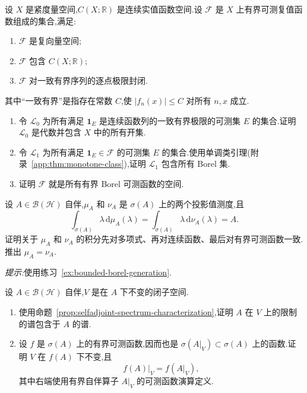 \begin{exercise}\label{ex:bounded-borel-generation}
设 \(X\) 是紧度量空间,\(C(X;\mathbb{R})\) 是连续实值函数空间.设 \(\mathcal{F}\) 是 \(X\) 上有界可测复值函数组成的集合,满足:
\begin{enumerate}
\item \(\mathcal{F}\) 是复向量空间;
\item \(\mathcal{F}\) 包含 \(C(X;\mathbb{R})\);
\item \(\mathcal{F}\) 对一致有界序列的逐点极限封闭.
\end{enumerate}
其中“一致有界”是指存在常数 \(C\),使 \(|f_{n}(x)|\leq C\) 对所有 \(n,x\) 成立.
\begin{enumerate}[label=(\alph*)]
\item 令 \(\mathcal{L}_{0}\) 为所有满足 \(\mathbf{1}_{E}\) 是连续函数列的一致有界极限的可测集 \(E\) 的集合.证明 \(\mathcal{L}_{0}\) 是代数并包含 \(X\) 中的所有开集.
\item 令 \(\mathcal{L}_{1}\) 为所有满足 \(\mathbf{1}_{E}\in\mathcal{F}\) 的可测集 \(E\) 的集合.使用单调类引理(附录~\ref{app:thm:monotone-class}),证明 \(\mathcal{L}_{1}\) 包含所有 Borel 集.
\item 证明 \(\mathcal{F}\) 就是所有有界 Borel 可测函数的空间.
\end{enumerate}
\end{exercise}

\begin{exercise}[投影值测度的唯一性]\label{ex:pvm-uniqueness}
设 \(A\in\mathcal{B}(\mathcal{H})\) 自伴,\(\mu_{A}\) 和 \(\nu_{A}\) 是 \(\sigma(A)\) 上的两个投影值测度,且
\[
\int_{\sigma(A)}\lambda\,\mathrm{d}\mu_{A}(\lambda)
=\int_{\sigma(A)}\lambda\,\mathrm{d}\nu_{A}(\lambda)=A.
\]
证明关于 \(\mu_{A}\) 和 \(\nu_{A}\) 的积分先对多项式、再对连续函数、最后对有界可测函数一致.推出 \(\mu_{A}=\nu_{A}\).

\emph{提示:}使用练习~\ref{ex:bounded-borel-generation}.
\end{exercise}

\begin{exercise}[不变子空间的谱]\label{ex:restriction-spectrum}
设 \(A\in\mathcal{B}(\mathcal{H})\) 自伴,\(V\) 是在 \(A\) 下不变的闭子空间.
\begin{enumerate}[label=(\alph*)]
\item 使用命题~\ref{prop:selfadjoint-spectrum-characterization},证明 \(A\) 在 \(V\) 上的限制的谱包含于 \(A\) 的谱.
\item 设 \(f\) 是 \(\sigma(A)\) 上的有界可测函数,因而也是 \(\sigma(A|_{V})\subset\sigma(A)\) 上的函数.证明 \(V\) 在 \(f(A)\) 下不变,且
\[
f(A)|_{V}=f(A|_{V}),
\]
其中右端使用有界自伴算子 \(A|_{V}\) 的可测函数演算定义.
\end{enumerate}
\end{exercise}

